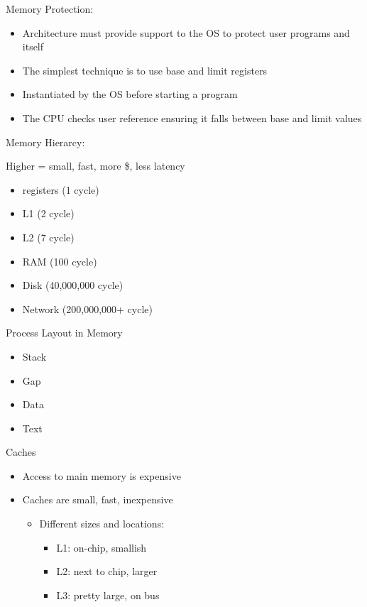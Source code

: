 \documentclass[12pt]{article}
\begin{document}
Memory Protection:
\begin{itemize}
    \item Architecture must provide support to the OS to protect user programs and itself
    \item The simplest technique is to use base and limit registers
    \item Instantiated by the OS before starting a program
    \item The CPU checks user reference ensuring it falls between base and limit values
\end{itemize}

Memory Hierarcy:

Higher = small, fast, more \$, less latency
\begin{itemize}
    \item registers (1 cycle)
    \item L1 (2 cycle)
    \item L2 (7 cycle)
    \item RAM (100 cycle)
    \item Disk (40,000,000 cycle)
    \item Network (200,000,000+ cycle)
\end{itemize}

Process Layout in Memory
\begin{itemize}
    \item Stack
    \item Gap 
    \item Data 
    \item Text
\end{itemize}

Caches
\begin{itemize}
    \item Access to main memory is expensive
    \item Caches are small, fast, inexpensive
    \begin{itemize}
        \item Different sizes and locations:
        \begin{itemize}
            \item L1: on-chip, smallish
            \item L2: next to chip, larger
            \item L3: pretty large, on bus
        \end{itemize}
    \end{itemize}
\end{itemize}
\end{document}
